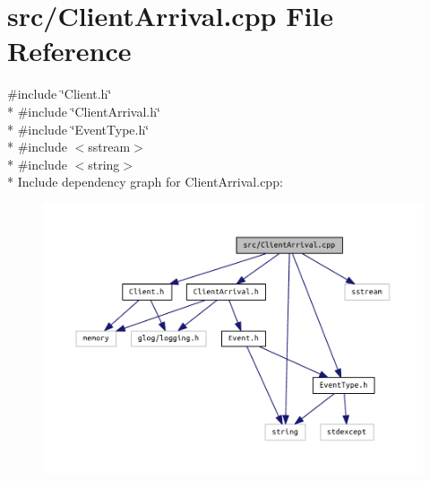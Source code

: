 \section{src/\+Client\+Arrival.cpp File Reference}
\label{_client_arrival_8cpp}
{\ttfamily \#include \char`\"{}Client.\+h\char`\"{}}\\*
{\ttfamily \#include \char`\"{}Client\+Arrival.\+h\char`\"{}}\\*
{\ttfamily \#include \char`\"{}Event\+Type.\+h\char`\"{}}\\*
{\ttfamily \#include $<$sstream$>$}\\*
{\ttfamily \#include $<$string$>$}\\*
Include dependency graph for Client\+Arrival.\+cpp\+:
\nopagebreak
\begin{figure}[H]
\begin{center}
\leavevmode
\includegraphics[width=350pt]{_client_arrival_8cpp__incl}
\end{center}
\end{figure}

